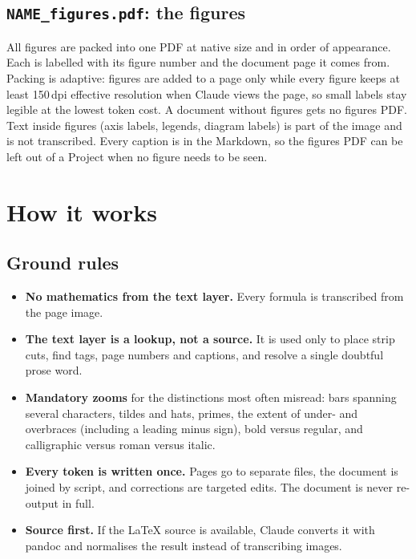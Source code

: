 \documentclass[11pt,a4paper]{article}
\begin{document}
\subsection{\texorpdfstring{\texttt{NAME\_figures.pdf}}{NAME\_figures.pdf}: the figures}
All figures are packed into one PDF at native size and in order of appearance. Each is
labelled with its figure number and the document page it comes from. Packing is adaptive:
figures are added to a page only while every figure keeps at least 150\,dpi effective
resolution when Claude views the page, so small labels stay legible at the lowest token cost.
A document without figures gets no figures PDF. Text inside figures (axis labels, legends,
diagram labels) is part of the image and is not transcribed. Every caption is in the
Markdown, so the figures PDF can be left out of a Project when no figure needs to be seen.

\section{How it works}

\subsection{Ground rules}
\begin{itemize}
\item \textbf{No mathematics from the text layer.} Every formula is transcribed from the page image.
\item \textbf{The text layer is a lookup, not a source.} It is used only to place strip cuts,
  find tags, page numbers and captions, and resolve a single doubtful prose word.
\item \textbf{Mandatory zooms} for the distinctions most often misread: bars spanning several
  characters, tildes and hats, primes, the extent of under- and overbraces (including a
  leading minus sign), bold versus regular, and calligraphic versus roman versus italic.
\item \textbf{Every token is written once.} Pages go to separate files, the document is joined
  by script, and corrections are targeted edits. The document is never re-output in full.
\item \textbf{Source first.} If the LaTeX source is available, Claude converts it with pandoc
  and normalises the result instead of transcribing images.
\end{itemize}
\end{document}
